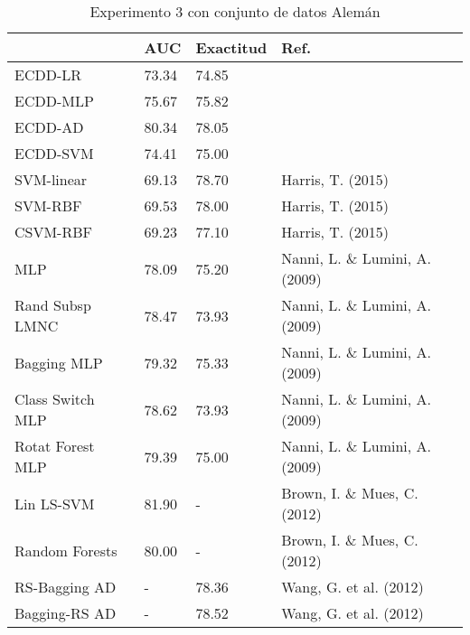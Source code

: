 \begin{table}[]
\centering
\caption{Experimento 3 con conjunto de datos Alemán}
\label{tab:german-proc3}
\begin{tabularx}{\textwidth}{|l|Y Y l|}
						\hline
						& AUC		& Exactitud	& Ref.									\\
						\hline
ECDD-LR					& 73.34		& 74.85		&										\\		%
ECDD-MLP				& 75.67		& 75.82		&										\\		%
ECDD-AD					& 80.34		& 78.05		&										\\		%
ECDD-SVM				& 74.41		& 75.00		&										\\		%
						\hline
SVM-linear				& 69.13		& 78.70		& Harris, T. (2015)						\\		%
SVM-RBF					& 69.53		& 78.00		& Harris, T. (2015)						\\		%
CSVM-RBF				& 69.23		& 77.10		& Harris, T. (2015)						\\		%
MLP						& 78.09		& 75.20		& Nanni, L. \& Lumini, A. (2009)		\\		%
Rand Subsp LMNC			& 78.47		& 73.93		& Nanni, L. \& Lumini, A. (2009)		\\		%
Bagging MLP				& 79.32		& 75.33		& Nanni, L. \& Lumini, A. (2009)		\\		%
Class Switch MLP		& 78.62		& 73.93		& Nanni, L. \& Lumini, A. (2009)		\\		%
Rotat Forest MLP		& 79.39		& 75.00		& Nanni, L. \& Lumini, A. (2009)		\\		%
Lin LS-SVM				& 81.90		& -			& Brown, I. \& Mues, C. (2012)			\\		%
Random Forests			& 80.00		& -			& Brown, I. \& Mues, C. (2012)			\\		%
RS-Bagging AD			& -			& 78.36		& Wang, G. et al. (2012)				\\		%
Bagging-RS AD			& -			& 78.52		& Wang, G. et al. (2012)				\\		%
						\hline
\end{tabularx}
\par
\end{table}


